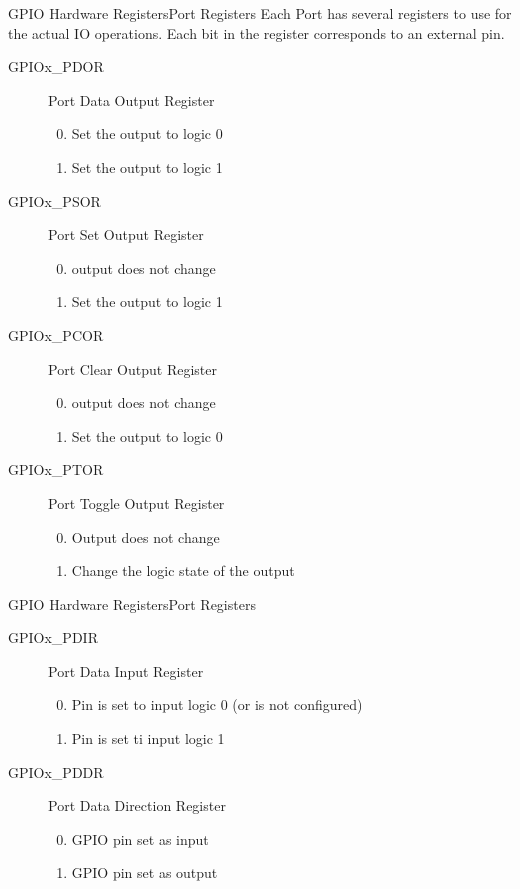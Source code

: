 \documentclass[xcolor=svgnames]{beamer}
\begin{document}
\begin{frame}{GPIO Hardware Registers}{Port Registers}
  Each Port has several registers to use for the actual IO operations.
  Each bit in the register corresponds to an external pin.
  \begin{description}
    \item[GPIOx\_PDOR] Port Data Output Register
    \begin{enumerate}\setcounter{enumi}{-1}
      \item Set the output to logic 0
      \item Set the output to logic 1
    \end{enumerate}
    \item[GPIOx\_PSOR] Port Set Output Register
    \begin{enumerate}\setcounter{enumi}{-1}
      \item output does not change
      \item Set the output to logic 1
    \end{enumerate}
    \item[GPIOx\_PCOR] Port Clear Output Register
    \begin{enumerate}\setcounter{enumi}{-1}
      \item output does not change
      \item Set the output to logic 0
    \end{enumerate}
    \item[GPIOx\_PTOR] Port Toggle Output Register
    \begin{enumerate}\setcounter{enumi}{-1}
      \item Output does not change
      \item Change the logic state of the output
    \end{enumerate}
  \end{description}
\end{frame}
\begin{frame}{GPIO Hardware Registers}{Port Registers}
  \begin{description}
    \item[GPIOx\_PDIR] Port Data Input Register
    \begin{enumerate}\setcounter{enumi}{-1}
      \item Pin is set to input logic 0 (or is not configured)
      \item Pin is set ti input logic 1
    \end{enumerate}
    \item[GPIOx\_PDDR] Port Data Direction Register
    \begin{enumerate}\setcounter{enumi}{-1}
      \item GPIO pin set as input
      \item GPIO pin set as output
    \end{enumerate}
  \end{description}
\end{frame}
\end{document}
